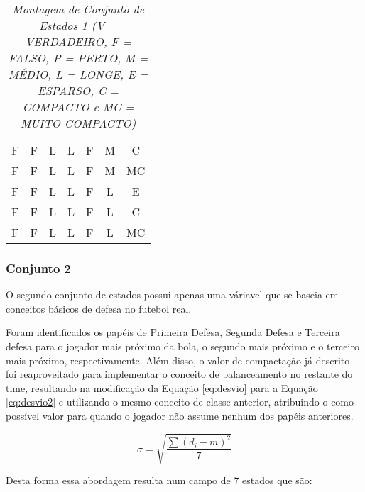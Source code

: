 \begin{table}[hbt]
\begin{tabular}{c|c|c|c|c|c|c}
        F       &   F       &   L       &   L       &   F       &   M       &   C \\
        F       &   F       &   L       &   L       &   F       &   M       &   MC \\
        F       &   F       &   L       &   L       &   F       &   L       &   E \\
        F       &   F       &   L       &   L       &   F       &   L       &   C \\
        F       &   F       &   L       &   L       &   F       &   L       &   MC \\
    \end{tabular}
    \caption{\textit{Montagem de Conjunto de Estados 1 (V = VERDADEIRO, F = FALSO, P = PERTO, M = MÉDIO, L = LONGE, E = ESPARSO, C = COMPACTO e MC = MUITO COMPACTO)}}
    \label{tab:states1}
\end{table}

\subsubsection{Conjunto 2}

O segundo conjunto de estados possui apenas uma váriavel que se baseia em
conceitos básicos de defesa no futebol real.

Foram identificados os papéis de Primeira Defesa, Segunda Defesa e Terceira
defesa para o jogador mais próximo da bola, o segundo mais próximo e o terceiro
mais próximo, respectivamente. Além disso, o valor de compactação já descrito
foi reaproveitado para implementar o conceito de balanceamento no restante do
time, resultando na modificação da Equação \ref{eq:desvio} para a Equação
\ref{eq:desvio2} e utilizando o mesmo conceito de classe anterior, atribuindo-o
como possível valor para quando o jogador não assume nenhum dos papéis anteriores.

\begin{equation}
    \sigma=\sqrt{\frac{\sum{(d_i - m)^2}}{7}}
    \label{eq:desvio2}
\end{equation}

Desta forma essa abordagem resulta num campo de 7 estados que são:

